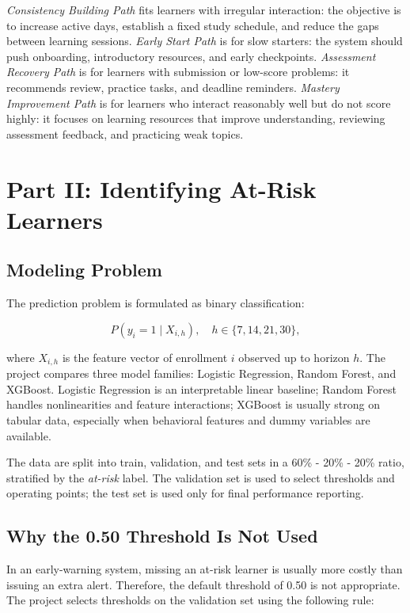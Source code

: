 \documentclass[conference]{IEEEtran}
\newcommand{\risk}{\textit{at-risk}}
\begin{document}
\textit{Consistency Building Path} fits learners with irregular interaction: the objective is to increase active days, establish a fixed study schedule, and reduce the gaps between learning sessions. \textit{Early Start Path} is for slow starters: the system should push onboarding, introductory resources, and early checkpoints. \textit{Assessment Recovery Path} is for learners with submission or low-score problems: it recommends review, practice tasks, and deadline reminders. \textit{Mastery Improvement Path} is for learners who interact reasonably well but do not score highly: it focuses on learning resources that improve understanding, reviewing assessment feedback, and practicing weak topics.

\section{Part II: Identifying At-Risk Learners}

\subsection{Modeling Problem}

The prediction problem is formulated as binary classification:

\begin{equation}
P(y_i=1 \mid X_{i,h}), \quad h \in \{7,14,21,30\},
\end{equation}

where \(X_{i,h}\) is the feature vector of enrollment \(i\) observed up to horizon \(h\). The project compares three model families: Logistic Regression, Random Forest, and XGBoost. Logistic Regression is an interpretable linear baseline; Random Forest handles nonlinearities and feature interactions; XGBoost is usually strong on tabular data, especially when behavioral features and dummy variables are available.

The data are split into train, validation, and test sets in a 60\% - 20\% - 20\% ratio, stratified by the \risk{} label. The validation set is used to select thresholds and operating points; the test set is used only for final performance reporting.

\subsection{Why the 0.50 Threshold Is Not Used}

In an early-warning system, missing an at-risk learner is usually more costly than issuing an extra alert. Therefore, the default threshold of 0.50 is not appropriate. The project selects thresholds on the validation set using the following rule:
\end{document}
